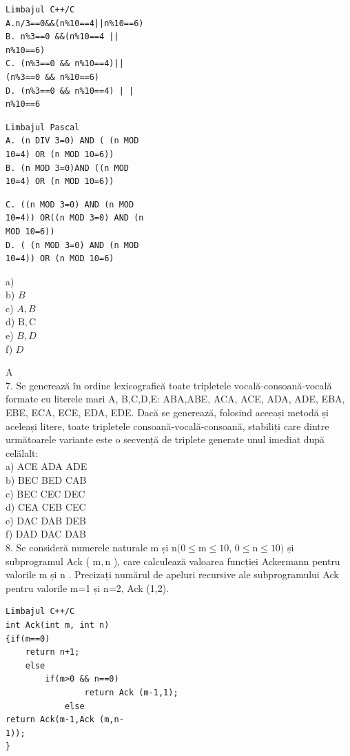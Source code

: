 \documentclass[10pt]{article}
\begin{document}
\begin{verbatim}
Limbajul C++/C
A.n/3==0&&(n%10==4||n%10==6)
B. n%3==0 &&(n%10==4 ||
n%10==6)
C. (n%3==0 && n%10==4)||
(n%3==0 && n%10==6)
D. (n%3==0 && n%10==4) | |
n%10==6
\end{verbatim}

\begin{verbatim}
Limbajul Pascal
A. (n DIV 3=0) AND ( (n MOD
10=4) OR (n MOD 10=6))
B. (n MOD 3=0)AND ((n MOD
10=4) OR (n MOD 10=6))
\end{verbatim}

\begin{verbatim}
C. ((n MOD 3=0) AND (n MOD
10=4)) OR((n MOD 3=0) AND (n
MOD 10=6))
D. ( (n MOD 3=0) AND (n MOD
10=4)) OR (n MOD 10=6)
\end{verbatim}

a)\\
b) $B$\\
c) $A, B$\\
d) $\mathrm{B}, \mathrm{C}$\\
e) $B, D$\\
f) $D$

A\\
7. Se generează în ordine lexicografică toate tripletele vocală-consoană-vocală formate cu literele mari A, B,C,D,E: ABA,ABE, ACA, ACE, ADA, ADE, EBA, EBE, ECA, ECE, EDA, EDE. Dacă se generează, folosind aceeași metodă și aceleași litere, toate tripletele consoană-vocală-consoană, stabiliți care dintre următoarele variante este o secvență de triplete generate unul imediat după celălalt:\\
a) ACE ADA ADE\\
b) BEC BED CAB\\
c) BEC CEC DEC\\
d) CEA CEB CEC\\
e) DAC DAB DEB\\
f) DAD DAC DAB\\
8. Se consideră numerele naturale m și $\mathrm{n}(0 \leq \mathrm{m} \leq 10$, $0 \leq \mathrm{n} \leq 10)$ și subprogramul Ack ( $\mathrm{m}, \mathrm{n}$ ), care calculează valoarea funcției Ackermann pentru valorile m și n . Precizați numărul de apeluri recursive ale subprogramului Ack pentru valorile m=1 și n=2, Ack (1,2).

\begin{verbatim}
Limbajul C++/C
int Ack(int m, int n)
{if(m==0)
    return n+1;
    else
        if(m>0 && n==0)
                return Ack (m-1,1);
            else
return Ack(m-1,Ack (m,n-
1));
}
\end{verbatim}
\end{document}

